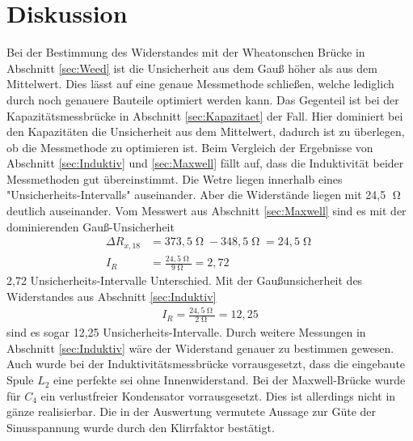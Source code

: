 \section{Diskussion}
\label{sec:Diskussion}
Bei der Bestimmung des Widerstandes mit der Wheatonschen Brücke in Abschnitt \ref{sec:Weed} ist die Unsicherheit aus dem Gauß höher als aus dem Mittelwert.
Dies lässt auf eine genaue Messmethode schließen, welche lediglich durch noch genauere Bauteile optimiert werden kann.
Das Gegenteil ist bei der Kapazitätsmessbrücke in Abschnitt \ref{sec:Kapazitaet} der Fall.
Hier dominiert bei den Kapazitäten die Unsicherheit aus dem Mittelwert, dadurch ist zu überlegen, ob die Messmethode zu optimieren ist.
Beim Vergleich der Ergebnisse von Abschnitt \ref{sec:Induktiv} und \ref{sec:Maxwell} fällt auf, dass die Induktivität beider Messmethoden gut übereinstimmt.
Die Wetre liegen innerhalb eines "Unsicherheits-Intervalls" auseinander.
Aber die Widerstände liegen mit 24,5 $\upOmega$ deutlich auseinander.
Vom Messwert aus Abschnitt \ref{sec:Maxwell} sind es mit der dominierenden Gauß-Unsicherheit
\begin{align*}
    \Delta R_{x,18} &= 373,5 \upOmega - 348,5 \upOmega = 24,5 \upOmega \\
    I_R &= \frac{24,5 \upOmega}{9 \upOmega} =2,72
\end{align*}
2,72 Unsicherheits-Intervalle Unterschied.
Mit der Gaußunsicherheit des Widerstandes aus Abschnitt \ref{sec:Induktiv}
\begin{align*}
    I_R = \frac{24,5 \upOmega}{2 \upOmega} = 12,25
\end{align*}
sind es sogar 12,25 Unsicherheits-Intervalle.
Durch weitere Messungen in Abschnitt \ref{sec:Induktiv} wäre der Widerstand genauer zu bestimmen gewesen.
Auch wurde bei der Induktivitätsmessbrücke vorrausgesetzt, dass die eingebaute Spule $L_2$ eine perfekte sei ohne Innenwiderstand.
Bei der Maxwell-Brücke wurde für $C_4$ ein verlustfreier Kondensator vorrausgesetzt.
Dies ist allerdings nicht in gänze realisierbar.
Die in der Auswertung vermutete Aussage zur Güte der Sinusspannung wurde durch den Klirrfaktor bestätigt.